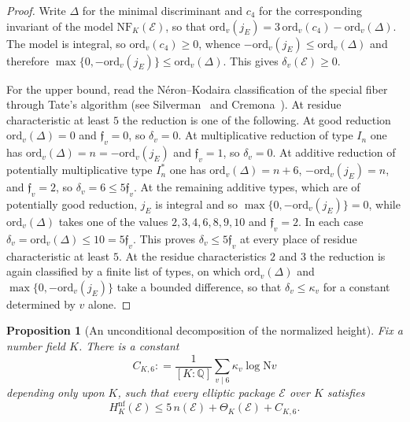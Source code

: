 \documentclass[10pt, reqno]{amsart}
\theoremstyle{plain}
\newtheorem{proposition}[theorem]{Proposition}
\theoremstyle{definition}
\theoremstyle{plain}
\newcommand{\Q}{\mathbb{Q}}
\newcommand{\coloneqq}{\mathrel{\mathop:}=}
\begin{document}
\begin{proof}
Write $\Delta$ for the minimal discriminant and $c_{4}$ for the corresponding invariant of the model $\mathrm{NF}_{K}(\mathcal{E})$, so that $\mathrm{ord}_{v}(j_{E})=3\,\mathrm{ord}_{v}(c_{4})-\mathrm{ord}_{v}(\Delta)$. The model is integral, so $\mathrm{ord}_{v}(c_{4})\ge 0$, whence $-\mathrm{ord}_{v}(j_{E})\le\mathrm{ord}_{v}(\Delta)$ and therefore $\max\{0,-\mathrm{ord}_{v}(j_{E})\}\le\mathrm{ord}_{v}(\Delta)$. This gives $\delta_{v}(\mathcal{E})\ge 0$.

For the upper bound, read the N\'eron--Kodaira classification of the special fiber through Tate's algorithm (see Silverman~\cite{SilvermanAEC} and Cremona~\cite{Cremona1997}). At residue characteristic at least $5$ the reduction is one of the following. At good reduction $\mathrm{ord}_{v}(\Delta)=0$ and $\mathfrak{f}_{v}=0$, so $\delta_{v}=0$. At multiplicative reduction of type $I_{n}$ one has $\mathrm{ord}_{v}(\Delta)=n=-\mathrm{ord}_{v}(j_{E})$ and $\mathfrak{f}_{v}=1$, so $\delta_{v}=0$. At additive reduction of potentially multiplicative type $I_{n}^{*}$ one has $\mathrm{ord}_{v}(\Delta)=n+6$, $-\mathrm{ord}_{v}(j_{E})=n$, and $\mathfrak{f}_{v}=2$, so $\delta_{v}=6\le 5\mathfrak{f}_{v}$. At the remaining additive types, which are of potentially good reduction, $j_{E}$ is integral and so $\max\{0,-\mathrm{ord}_{v}(j_{E})\}=0$, while $\mathrm{ord}_{v}(\Delta)$ takes one of the values $2,3,4,6,8,9,10$ and $\mathfrak{f}_{v}=2$. In each case $\delta_{v}=\mathrm{ord}_{v}(\Delta)\le 10=5\mathfrak{f}_{v}$. This proves $\delta_{v}\le 5\mathfrak{f}_{v}$ at every place of residue characteristic at least $5$. At the residue characteristics $2$ and $3$ the reduction is again classified by a finite list of types, on which $\mathrm{ord}_{v}(\Delta)$ and $\max\{0,-\mathrm{ord}_{v}(j_{E})\}$ take a bounded difference, so that $\delta_{v}\le\kappa_{v}$ for a constant determined by $v$ alone.
\end{proof}

\begin{proposition}[An unconditional decomposition of the normalized height]
\label{prop:UnconditionalNormalizedDecomposition}
Fix a number field $K$. There is a constant
\[
  C_{K,6}
  \coloneqq
  \frac{1}{[K:\Q]}
  \sum_{v\mid 6}
  \kappa_{v}\log \mathrm{N}v
\]
depending only upon $K$, such that every elliptic package $\mathcal{E}$ over $K$ satisfies
\[
  H^{\mathrm{nf}}_{K}(\mathcal{E})
  \le
  5\,n(\mathcal{E})+\Theta_{K}(\mathcal{E})+C_{K,6}.
\]
\end{proposition}
\end{document}
